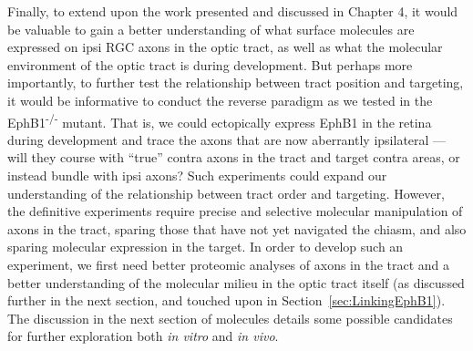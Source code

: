 Finally, to extend upon the work presented and discussed in Chapter 4, it would be valuable to gain a better understanding of what surface molecules are expressed on ipsi RGC axons in the optic tract, as well as what the molecular environment of the optic tract is during development.
But perhaps more importantly, to further test the relationship between tract position and targeting, it would be informative to conduct the reverse paradigm as we tested in the EphB1\textsuperscript{-/-} mutant.
That is, we could ectopically express EphB1 in the retina during development and trace the axons that are now aberrantly ipsilateral --- will they course with ``true'' contra axons in the tract and target contra areas, or instead bundle with ipsi axons?
Such experiments could expand our understanding of the relationship between tract order and targeting.
However, the definitive experiments require precise and selective molecular manipulation of axons in the tract, sparing those that have not yet navigated the chiasm, and also sparing molecular expression in the target.
In order to develop such an experiment, we first need better proteomic analyses of axons in the tract and a better understanding of the molecular milieu in the optic tract itself (as discussed further in the next section, and touched upon in Section~\ref{sec:LinkingEphB1}).
The discussion in the next section of molecules details some possible candidates for further exploration both \emph{in vitro} and \emph{in vivo}.
